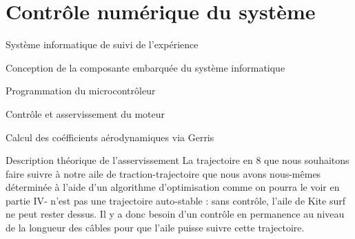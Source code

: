 \documentclass[a4paper,twoside,12pt]{article}
\newcounter{partie}
\newcounter{sous-partie}
\newenvironment{partie}[1]
{
\section{#1}
}
{

}
\newenvironment{sous-partie}[1]
{
\subsection{#1}
}
{

}
\newenvironment{sous-sous-partie}[1]
{
\subsubsection{#1}
}
{

}
\begin{document}
\begin{partie}{Contrôle numérique du système}
\begin{sous-partie}{Système informatique de suivi de l'expérience}
\begin{sous-sous-partie}{Conception de la composante embarquée du système informatique}
\begin{paragraph}{Programmation du microcontrôleur\vspace{0.3cm}\\}
\begin{subparagraph}{Contrôle et asservissement du moteur}
\end{subparagraph}

\end{paragraph}

\end{sous-sous-partie}

\end{sous-partie}



\begin{sous-partie}{Calcul des coéfficients aérodynamiques via Gerris}

\end{sous-partie}

\begin{sous-partie}{Description théorique de l'asservissement}
La trajectoire en 8 que nous souhaitons faire suivre à notre aile de traction-trajectoire que nous avons nous-mêmes déterminée à l'aide d'un algorithme d'optimisation comme on pourra le voir en partie IV- n'est pas une trajectoire auto-stable : sans contrôle, l'aile de Kite surf ne peut rester dessus. %
Il y a donc besoin d'un contrôle en permanence au niveau de la longueur des câbles pour que l'aile puisse suivre cette trajectoire. %


\end{sous-partie}
\end{partie}
\end{document}
